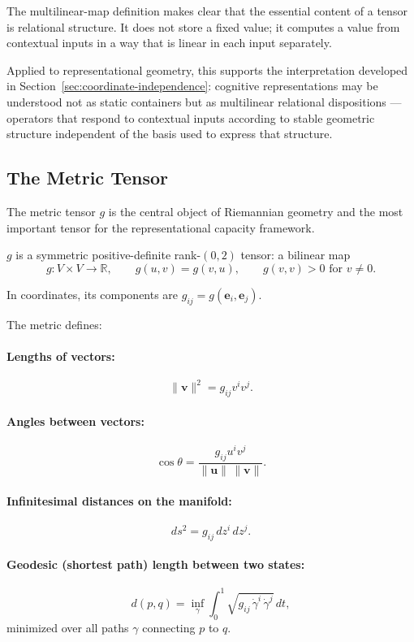 \documentclass[12pt,a4paper]{article}
\begin{document}
The multilinear-map definition makes clear that the essential content of a tensor is relational structure. It does not store a fixed value; it computes a value from contextual inputs in a way that is linear in each input separately.

Applied to representational geometry, this supports the interpretation developed in Section~\ref{sec:coordinate-independence}: cognitive representations may be understood not as static containers but as multilinear relational dispositions --- operators that respond to contextual inputs according to stable geometric structure independent of the basis used to express that structure.

\subsection{The Metric Tensor}

The metric tensor $g$ is the central object of Riemannian geometry and the most important tensor for the representational capacity framework.

$g$ is a symmetric positive-definite rank-$(0, 2)$ tensor: a bilinear map
\[
g : V \times V \to \mathbb{R}, \qquad g(u, v) = g(v, u), \qquad g(v, v) > 0 \text{ for } v \neq 0.
\]

In coordinates, its components are $g_{ij} = g(\mathbf{e}_i, \mathbf{e}_j)$.

The metric defines:

\paragraph{Lengths of vectors:}
\[
\|\mathbf{v}\|^2 = g_{ij} v^i v^j.
\]

\paragraph{Angles between vectors:}
\[
\cos\theta = \frac{g_{ij} u^i v^j}{\|\mathbf{u}\| \, \|\mathbf{v}\|}.
\]

\paragraph{Infinitesimal distances on the manifold:}
\[
ds^2 = g_{ij} \, dz^i \, dz^j.
\]

\paragraph{Geodesic (shortest path) length between two states:}
\[
d(p, q) = \inf_\gamma \int_0^1 \sqrt{g_{ij} \, \dot\gamma^i \, \dot\gamma^j} \, dt,
\]
minimized over all paths $\gamma$ connecting $p$ to $q$.
\end{document}
